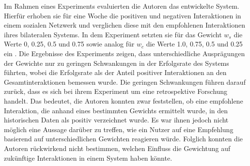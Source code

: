 Im Rahmen eines Experiments evaluierten die Autoren das entwickelte System.
Hierfür erhoben sie für eine Woche die positiven und negativen Interaktionen in einem sozialen Netzwerk und verglichen diese mit den empfohlenen Interaktionen ihres bilateralen Systems.
In dem Experiment setzten sie für das Gewicht $w_{s}$ die Werte 0, 0.25, 0.5 und 0.75 sowie analog für $w_{c}$ die Werte 1.0, 0.75, 0.5 und 0.25 ein \cite[S. 251]{kim:2:inproceedings}.
Die Ergebnisse des Experiments zeigen, dass unterschiedliche Ausprägungen der Gewichte nur zu geringen Schwankungen in der Erfolgsrate des Systems führten, wobei die Erfolgsrate als der Anteil positiver Interaktionen an den Gesamtinteraktionen bemessen wurde.
Die geringen Schwankungen führen \textcite[S. 219]{kim:2:inproceedings} darauf zurück, dass es sich bei ihrem Experiment um eine retrospektive Forschung handelt.
Das bedeutet, die Autoren konnten zwar feststellen, ob eine empfohlene Interaktion, die anhand eines bestimmten Gewichts ermittelt wurde, in den historischen Daten als positiv verzeichnet wurde.
Es war ihnen jedoch nicht möglich eine Aussage darüber zu treffen, wie ein Nutzer auf eine Empfehlung basierend auf unterschiedlichen Gewichten reagieren würde.
Folglich konnten die Autoren rückwirkend nicht bestimmen, welchen Einfluss die Gewichtung auf zukünftige Interaktionen in einem System haben könnte.

